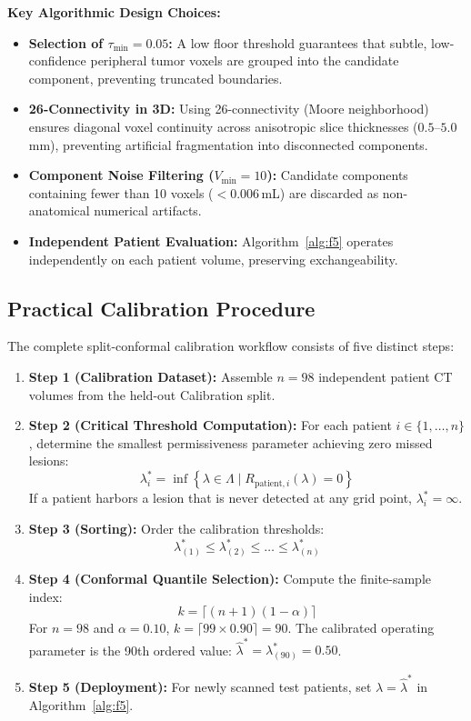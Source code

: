 \documentclass[journal,10pt,twocolumn]{IEEEtran}
\begin{document}
\textbf{Key Algorithmic Design Choices:}
\begin{itemize}
    \item \textbf{Selection of $\tau_{\min} = 0.05$:} A low floor threshold guarantees that subtle, low-confidence peripheral tumor voxels are grouped into the candidate component, preventing truncated boundaries.
    \item \textbf{26-Connectivity in 3D:} Using 26-connectivity (Moore neighborhood) ensures diagonal voxel continuity across anisotropic slice thicknesses ($0.5$--$5.0$\,mm), preventing artificial fragmentation into disconnected components.
    \item \textbf{Component Noise Filtering ($V_{\min} = 10$):} Candidate components containing fewer than 10 voxels ($< 0.006$\,mL) are discarded as non-anatomical numerical artifacts.
    \item \textbf{Independent Patient Evaluation:} Algorithm~\ref{alg:f5} operates independently on each patient volume, preserving exchangeability.
\end{itemize}

\subsection{Practical Calibration Procedure}
The complete split-conformal calibration workflow consists of five distinct steps:
\begin{enumerate}
    \item \textbf{Step 1 (Calibration Dataset):} Assemble $n=98$ independent patient CT volumes from the held-out Calibration split.
    \item \textbf{Step 2 (Critical Threshold Computation):} For each patient $i \in \{1, \dots, n\}$, determine the smallest permissiveness parameter achieving zero missed lesions:
    \begin{equation}
    \lambda_i^* = \inf \left\{\lambda \in \Lambda \mid R_{\mathrm{patient}, i}(\lambda) = 0\right\}
    \end{equation}
    If a patient harbors a lesion that is never detected at any grid point, $\lambda_i^* = \infty$.
    \item \textbf{Step 3 (Sorting):} Order the calibration thresholds:
    \begin{equation}
    \lambda_{(1)}^* \le \lambda_{(2)}^* \le \dots \le \lambda_{(n)}^*
    \end{equation}
    \item \textbf{Step 4 (Conformal Quantile Selection):} Compute the finite-sample index:
    \begin{equation}
    k = \lceil (n + 1)(1 - \alpha) \rceil
    \end{equation}
    For $n=98$ and $\alpha = 0.10$, $k = \lceil 99 \times 0.90 \rceil = 90$. The calibrated operating parameter is the 90th ordered value: $\hat{\lambda}^* = \lambda_{(90)}^* = 0.50$.
    \item \textbf{Step 5 (Deployment):} For newly scanned test patients, set $\lambda = \hat{\lambda}^*$ in Algorithm~\ref{alg:f5}.
\end{enumerate}
\end{document}
